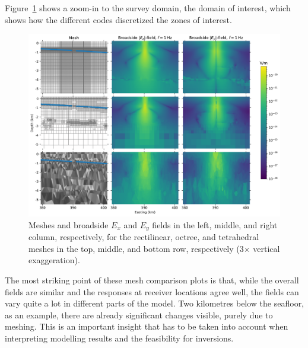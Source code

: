 \documentclass[onecolumn,extra,camera]{gji}
\begin{document}
Figure~\ref{fig:results-marlim_survey} shows a zoom-in to the survey domain, the domain of interest, which shows how the different codes discretized the zones of interest.
%
\begin{figure}
  \centering
  \includegraphics[width=.9\linewidth]{figures/results-marlim_survey}
  \caption{Meshes and broadside $E_x$ and $E_y$ fields in the left, middle, and right column, respectively, for the rectilinear, octree, and tetrahedral meshes in the top, middle, and bottom row, respectively (3$\times$ vertical exaggeration).}
  \label{fig:results-marlim_survey}
\end{figure}
%
The most striking point of these mesh comparison plots is that, while the overall fields are similar and the responses at receiver locations agree well, the fields can vary quite a lot in different parts of the model. Two kilometres below the seafloor, as an example, there are already significant changes visible, purely due to meshing. This is an important insight that has to be taken into account when interpreting modelling results and the feasibility for inversions.
\end{document}
